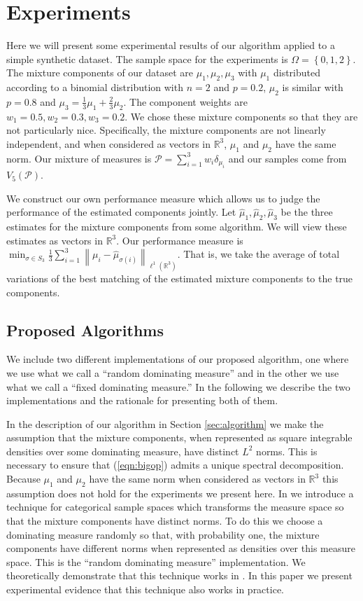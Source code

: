 \documentclass[aos,preprint]{imsart}
\def\rn{\mathbb{R}}
\def\l{\left}
\def\r{\right}
\def\sP{\mathscr{P}}
\theoremstyle{plain}
\theoremstyle{defintion}
\begin{document}
\section{Experiments} \label{sec:experiments}
Here we will present some experimental results of our algorithm applied to a simple synthetic dataset. The sample space for the experiments is $\Omega = \left\{ 0,1,2 \right\}$. The mixture components of our dataset are $\mu_1,\mu_2,\mu_3$ with $\mu_1$ distributed according to a binomial distribution with $n=2$ and $p = 0.2$, $\mu_2$ is similar with $p=0.8$ and $\mu_3 = \frac{1}{3} \mu_1 + \frac{2}{3}\mu_2$. The component weights are $w_1 = 0.5, w_2 = 0.3, w_3 = 0.2$. We chose these mixture components so that they are not particularly nice. Specifically,  the mixture components are not linearly independent, and when considered as vectors in $\rn^3$, $\mu_1$ and $\mu_2$ have the same norm. Our mixture of measures is $\sP = \sum_{i=1}^3 w_i \delta_{\mu_i}$ and our samples come from $V_5\left( \sP \right)$.

	 We construct our own performance measure which allows us to judge the performance of the estimated components jointly. Let $\widehat{\mu}_1, \widehat{\mu}_2,\widehat{\mu}_3$ be the three estimates for the mixture components from some algorithm. We will view these estimates as vectors in $\rn^3$. Our performance measure is $\min_{\sigma \in S_3} \frac{1}{3}\sum_{i=1}^3 \l\|\mu_i - \widehat{\mu}_{\sigma\left( i \right)}\r\|_{\ell^1\left( \rn^3 \right)}$. That is, we take the average of total variations of the best matching of the estimated mixture components to the true components.
	\subsection{Proposed Algorithms} \label{sec:propalg}
	We include two different implementations of our proposed algorithm, one where we use what we call a ``random dominating measure'' and in the other we use what we call a ``fixed dominating measure.'' In the following we describe the two implementations and the rationale for presenting both of them.
        
        In the description of our algorithm in Section \ref{sec:algorithm} we make the assumption that the mixture components, when represented as square integrable densities over some dominating measure, have distinct $L^2$ norms. This is necessary to ensure that (\ref{eqn:bigop}) admits a unique spectral decomposition. Because $\mu_1$ and $\mu_2$ have the same norm when considered as vectors in $\rn^3$ this assumption does not hold for the experiments we present here. In \cite{arxiv16} we introduce a technique for categorical sample spaces which transforms the measure space so that the mixture components have distinct norms. To do this we choose a dominating measure randomly so that, with probability one, the mixture components have different norms when represented as densities over this measure space. This is the ``random dominating measure'' implementation. We theoretically demonstrate that this technique works in \cite{arxiv16}. In this paper we present experimental evidence that this technique also works in practice.
	
\end{document}
